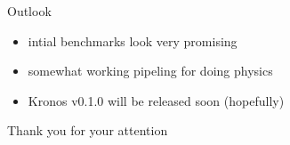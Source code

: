 \begin{frame}{Outlook}
  \begin{itemize}
    \item intial benchmarks look very promising
    \vspace{0.5cm}
    \item somewhat working pipeling for doing physics
    \vspace{0.5cm}
    \item Kronos v0.1.0 will be released soon (hopefully)
  \end{itemize}

  \vspace{1cm}

  \centering
  Thank you for your attention\\
  
\end{frame}

